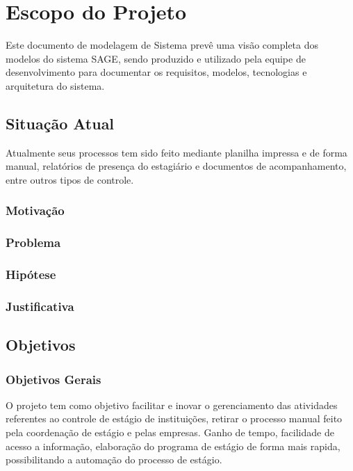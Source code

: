 \chapter{Escopo do Projeto}
\label{cap:escopodoprojeto}

Este documento de modelagem de Sistema prevê uma visão completa dos modelos do
sistema SAGE, sendo produzido e utilizado pela equipe de desenvolvimento para
documentar os requisitos, modelos, tecnologias e arquitetura do sistema. 

\section{Situação Atual}
\label{sec:situacaoatual}

Atualmente seus processos tem sido feito mediante planilha impressa e de forma
manual, relatórios de presença do estagiário e documentos de acompanhamento,
entre outros tipos de controle.  

\subsection{Motivação}
\label{subsec:motivacao}

\subsection{Problema}
\label{subsec:problema}

\subsection{Hipótese}
\label{subsec:hipotese}

\subsection{Justificativa}
\label{subsec:justificativa}

\section{Objetivos}
\label{sec:objetivo}

\subsection{Objetivos Gerais}
\label{subsec:objetivosgerais}

O projeto tem como objetivo facilitar e inovar o gerenciamento das atividades
referentes ao controle de estágio de instituições, retirar o processo manual
feito pela coordenação de estágio e pelas empresas. Ganho de tempo, facilidade
de acesso a informação, elaboração do programa de estágio de forma mais rapida,
possibilitando a automação do processo de estágio. 

